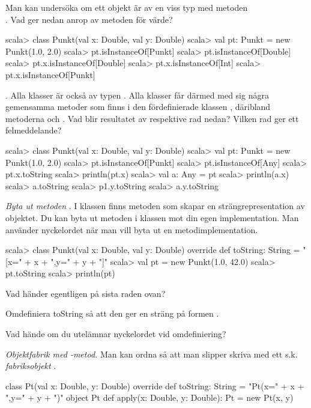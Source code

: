 \Subtask Man kan undersöka om ett objekt är av en viss typ med metoden \\ . Vad ger nedan anrop av metoden  för värde?
\begin{REPL}
scala> class Punkt(val x: Double, val y: Double)
scala> val pt: Punkt = new Punkt(1.0, 2.0)
scala> pt.isInstanceOf[Punkt]
scala> pt.isInstanceOf[Double]
scala> pt.x.isInstanceOf[Double]
scala> pt.x.isInstanceOf[Int]
scala> pt.x.isInstanceOf[Punkt]
\end{REPL}

\Task \emph{}. Alla klasser är också av typen . Alla klasser får därmed med sig några gemensamma metoder som finns i den fördefinierade klassen , däribland metoderna   och .  Vad blir resultatet av respektive rad nedan? Vilken rad ger ett felmeddelande?

\begin{REPL}
scala> class Punkt(val x: Double, val y: Double)
scala> val pt: Punkt = new Punkt(1.0, 2.0)
scala> pt.isInstanceOf[Punkt]
scala> pt.isInstanceOf[Any]
scala> pt.x.toString
scala> println(pt.x)
scala> val a: Any = pt
scala> println(a.x)
scala> a.toString
scala> p1.y.toString
scala> a.y.toString
\end{REPL}

\Task \emph{Byta ut metoden }. I klassen  finns metoden  som skapar en strängrepresentation av objektet. Du kan byta ut metoden  i klassen  mot din egen implementation. Man använder nyckelordet  när man vill byta ut en metodimplementation.

\begin{REPL}
scala> class Punkt(val x: Double, val y: Double) {
         override def toString: String = "[x=" + x + ",y=" + y + "]"
       }
scala> val pt = new Punkt(1.0, 42.0)
scala> pt.toString
scala> println(pt)
\end{REPL}

\Subtask Vad händer egentligen på sista raden ovan?

\Subtask Omdefiniera toString så att den ger en sträng på formen .

\Subtask Vad hände om du utelämnar nyckelordet  vid omdefiniering?

\Task \emph{Objektfabrik med -metod.} Man kan ordna så att man slipper skriva  med ett s.k. \emph{fabriksobjekt} . 
\begin{Code}
class Pt(val x: Double, y: Double) {
  override def toString: String = "Pt(x=" + x + ",y=" + y + ")"
}
object Pt { 
  def apply(x: Double, y: Double): Pt = new Pt(x, y)
}
\end{Code}

